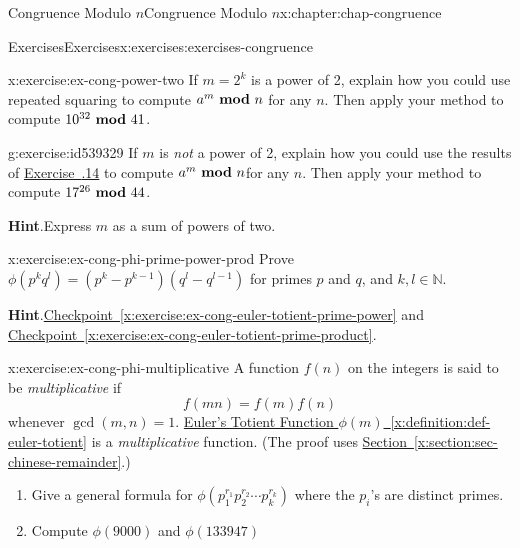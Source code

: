\documentclass[oneside,10pt,]{book}
\newcommand{\blocktitlefont}{\relax}
\newcommand{\xreffont}{\relax}
\numberwithin{equation}{section}
\newcommand{\mmod}[1]{\ \mathrm{\bf mod}\ #1}
\begin{document}
\begin{chapterptx}{Congruence Modulo \(n\)}{}{Congruence Modulo \(n\)}{}{}{x:chapter:chap-congruence}
\begin{exercises-section}{Exercises}{}{Exercises}{}{}{x:exercises:exercises-congruence}
\begin{divisionexercise}{14}{}{}{x:exercise:ex-cong-power-two}
If \(m = 2^k\) is a power of 2, explain how you could use repeated squaring to compute \(a^m \mmod{n}\) for any \(n\). Then apply your method to compute \(10^{32} \mmod 41\).%
\end{divisionexercise}%
\begin{divisionexercise}{15}{}{}{g:exercise:id539329}%
If \(m\) is \emph{not} a power of 2, explain how you could use the results of \hyperlink{x:exercise:ex-cong-power-two}{Exercise~{\xreffont 4.6.14}} to compute \(a^m \mmod{n}\)for any \(n\). Then apply your method to compute \(17^{26} \mmod 44\).%
\par\smallskip%
\noindent\textbf{\blocktitlefont Hint}.\hypertarget{g:hint:id539336}{}\quad{}Express \(m\) as a sum of powers of two.%
\end{divisionexercise}%
\begin{divisionexercise}{16}{}{}{x:exercise:ex-cong-phi-prime-power-prod}%
Prove \(\phi(p^kq^l) = \left(p^k-p^{k-1}\right)\left(q^l - q^{l-1}\right)\) for primes \(p\) and \(q\), and \(k,l\in\mathbb{N}\).%
\par\smallskip%
\noindent\textbf{\blocktitlefont Hint}.\hypertarget{g:hint:id539386}{}\quad{}\hyperref[x:exercise:ex-cong-euler-totient-prime-power]{Checkpoint~{\xreffont\ref{x:exercise:ex-cong-euler-totient-prime-power}}} and \hyperref[x:exercise:ex-cong-euler-totient-prime-product]{Checkpoint~{\xreffont\ref{x:exercise:ex-cong-euler-totient-prime-product}}}.%
\end{divisionexercise}%
\begin{divisionexercise}{17}{}{}{x:exercise:ex-cong-phi-multiplicative}%
A function \(f(n)\) on the integers is said to be \emph{multiplicative} if%
\begin{equation*}
f(mn) = f(m)f(n)
\end{equation*}
whenever \(\gcd(m,n) = 1\). \hyperref[x:definition:def-euler-totient]{Euler's Totient Function \(\phi(m)\)~{\xreffont\ref{x:definition:def-euler-totient}}} is a \emph{multiplicative} function. (The proof uses \hyperref[x:section:sec-chinese-remainder]{Section~{\xreffont\ref{x:section:sec-chinese-remainder}}}.)%
\par
%
\begin{enumerate}[label=(\alph*)]
\item{}Give a general formula for \(\phi(p_1^{r_1}p_2^{r_2}\cdots p_k^{r_k})\) where the \(p_i\)'s are distinct primes.%
\item{}Compute \(\phi(9000)\) and \(\phi(133947)\)%
\end{enumerate}
%
\end{divisionexercise}%

\end{exercises-section}
\end{chapterptx}
\end{document}
